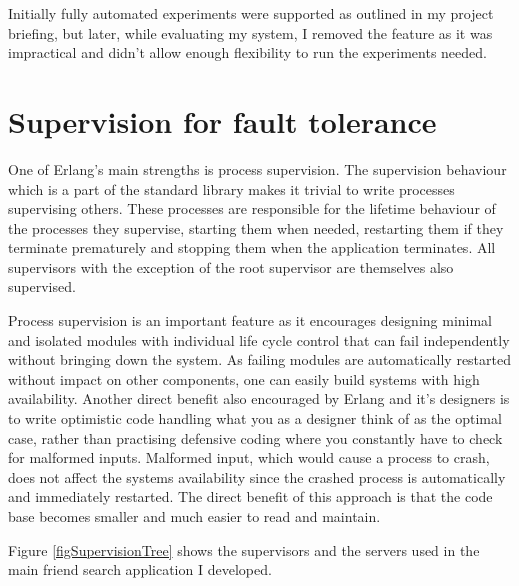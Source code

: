 Initially fully automated experiments were supported as outlined in my project briefing, but later, while evaluating my system, I removed the feature as it was impractical and didn't allow enough flexibility to run the experiments needed.

\section{Supervision for fault tolerance}
One of Erlang's main strengths is process supervision.
The supervision behaviour which is a part of the standard library makes it trivial to write processes supervising others. These processes are responsible for the lifetime behaviour of the processes they supervise, starting them when needed, restarting them if they terminate prematurely and stopping them when the application terminates. All supervisors with the exception of the root supervisor are themselves also supervised.

Process supervision is an important feature as it encourages designing minimal and isolated modules with individual life cycle control that can fail independently without bringing down the system. As failing modules are automatically restarted without impact on other components, one can easily build systems with high availability.
Another direct benefit also encouraged by Erlang and it's designers is to write optimistic code handling what you as a designer think of as the optimal case, rather than practising defensive coding where you constantly have to check for malformed inputs. Malformed input, which would cause a process to crash, does not affect the systems availability since the crashed process is automatically and immediately restarted. The direct benefit of this approach is that the code base becomes smaller and much easier to read and maintain.

Figure \ref{figSupervisionTree} shows the supervisors and the servers used in the main friend search application I developed.

